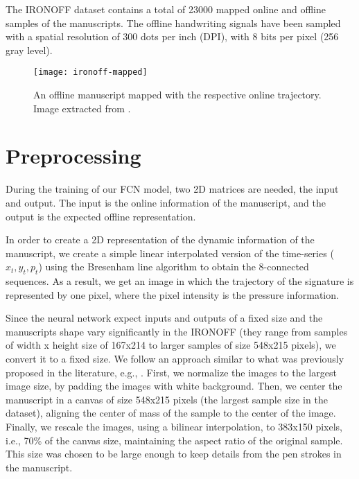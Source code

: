 The IRONOFF dataset contains a total of 23000 mapped online and offline samples of the manuscripts. The offline handwriting signals have been sampled with a spatial resolution of 300 dots per inch (DPI), with 8 bits per pixel (256 gray level).

\begin{figure}[!htb]
\centering
\texttt{[image: ironoff-mapped]}
\caption{An offline manuscript mapped with the respective online trajectory. Image extracted from \cite{viard1999ireste}.}
\label{fig:ironoff-mapped}
\end{figure}


\section{Preprocessing}
During the training of our FCN model, two 2D matrices are needed, the input and output. The input is the online information of the manuscript, and the output is the expected offline representation.

In order to create a 2D representation of the dynamic information of the manuscript, we create a simple linear interpolated version of the time-series ($x_{t}, y_{t}, p_{t}$) using the Bresenham line algorithm \cite{bresenham} to obtain the 8-connected sequences. As a result, we get an image in which the trajectory of the signature is represented by one pixel, where the pixel intensity is the pressure information.

Since the neural network expect inputs and outputs of a fixed size and the manuscripts shape vary significantly in the IRONOFF (they range from samples of width x height size of 167x214 to larger samples of size 548x215 pixels), we convert it to a fixed size. We follow an approach similar to what was previously proposed in the literature, e.g., \cite{pourshahabi2009offline}. First, we normalize the images to the largest image size, by padding the images with white background. Then, we center the manuscript in a canvas of size 548x215 pixels (the largest sample size in the dataset), aligning the center of mass of the sample to the center of the image. Finally, we rescale the images, using a bilinear interpolation, to 383x150 pixels, i.e., 70\% of the canvas size, maintaining the aspect ratio of the original sample. This size was chosen to be large enough to keep details from the pen strokes in the manuscript.


